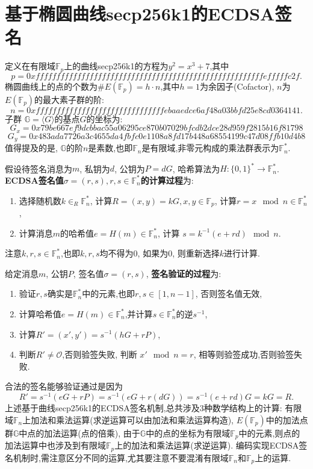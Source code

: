 \documentclass{article}
\renewcommand{\G}{\mathbb{G}}
\newcommand{\F}{\mathbb{F}}
\begin{document}
\section{基于椭圆曲线secp256k1的ECDSA签名}

定义在有限域$\F_p$上的曲线secp256k1的方程为$y^2 = x^3 + 7$,其中
\footnotesize
$$p = 0xfffffffffffffffffffffffffffffffffffffffffffffffffffffffefffffc2f.$$
\normalsize
椭圆曲线上的点的个数为$\#E(\F_p) = h \cdot n$,其中$h = 1$为余因子(Cofactor), $n$为$E(\F_p)$的最大素子群的阶:
\footnotesize
$$ n = 0xfffffffffffffffffffffffffffffffebaaedce6af48a03bbfd25e8cd0364141.$$
\normalsize
子群 $\G = \langle G \rangle$的基点$G$的坐标为:
\footnotesize
$$G_x = 0x79be667ef9dcbbac55a06295ce870b07029bfcdb2dce28d959f2815b16f81798$$
$$G_y = 0x483ada7726a3c4655da4fbfc0e1108a8fd17b448a68554199c47d08ffb10d4b8$$
\normalsize
值得提及的是, $\G$的阶$n$是素数,也即$\F_n$是有限域,非零元构成的乘法群表示为$\F_n^*$.

假设待签名消息为$m$, 私钥为$d$, 公钥为$P=dG$, 哈希算法为$H: \{0,1\}^*\rightarrow\F_n^*$.
\textbf{ECDSA签名值$\sigma = (r,s), r, s \in \F_n^*$的计算过程}为: 
\begin{enumerate}
\item 选择随机数$k\in_R\F_n^*$, 计算$R = (x,y) = kG, x, y \in \F_p$, 计算$r = x\mod n \in \F_n^*$,
\item 计算消息$m$的哈希值$e=H(m)\in\F_n^*$, 计算 $s = k^{-1} (e + rd) \mod n$. 
\end{enumerate}
注意$k, r, s \in \F_n^*$,也即$k, r, s$均不得为0, 如果为0, 则重新选择$k$进行计算.

给定消息$m$, 公钥$P$, 签名值$\sigma = (r, s)$, \textbf{签名验证的过程}为:
\begin{enumerate}
\item  验证$r, s$确实是$\F_n^*$中的元素,也即$r, s \in [1, n-1]$, 否则签名值无效,
\item 计算哈希值$e=H(m)\in\F_n^*$,并计算$s\in\F_n^*$的逆$s^{-1}$,
\item  计算$R' = (x', y') = s^{-1}(hG + rP)$, 
\item 判断$R' \neq \mathcal{O}$,否则验签失败, 判断 $x' \mod n = r$, 相等则验签成功,否则验签失败.
\end{enumerate}
合法的签名能够验证通过是因为
$$R' = s^{-1}(eG + rP) = s^{-1}(eG + r(dG)) = s^{-1}(e+rd)G = kG = R.$$
上述基于曲线secp256k1的ECDSA签名机制,总共涉及3种数学结构上的计算:
有限域$\F_n$上加法和乘法运算(求逆运算可以由加法和乘法运算构造), $E(\F_p)$中的加法点群$\G$中点的加法运算(点的倍乘),
由于$\G$中的点的坐标为有限域$\F_p$中的元素,则点的加法运算中也涉及到有限域$\F_p$上的加法和乘法运算(求逆运算).
编码实现ECDSA签名机制时,需注意区分不同的运算,尤其要注意不要混淆有限域$\F_n$和$\F_p$上的运算.
\end{document}
